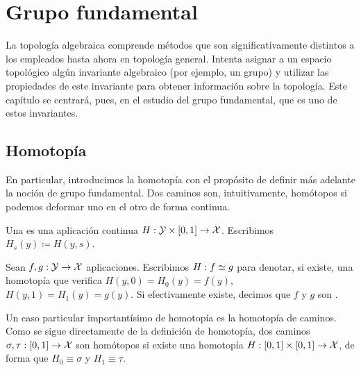 \chapter{Grupo fundamental}
\label{grf}

La topología algebraica comprende métodos que son significativamente distintos a los empleados hasta ahora en topología general. Intenta asignar a un espacio topológico algún invariante algebraico (por ejemplo, un grupo) y utilizar las propiedades de este invariante para obtener información sobre la topología. Este capítulo se centrará, pues, en el estudio del grupo fundamental, que es uno de estos invariantes.

\section{Homotopía}

En particular, introducimos la homotopía con el propósito de definir más adelante la noción de grupo fundamental. Dos caminos son, intuitivamente, homótopos si podemos deformar uno en el otro de forma continua.

\begin{defi}[Homotopía]
	Una  es una aplicación continua $H:\mathcal{Y}\times [0,1]\to \mathcal{X}$. Escribimos $H_s(y) \coloneqq H(y,s)$.
\end{defi}

\begin{defi}
	Sean $f,g:\mathcal{Y}\to\mathcal{X}$ aplicaciones. Escribimos $H:f\mathrel{\smash{\underset{}{\simeq}}} g$ para denotar, si existe, una homotopía que verifica $H(y,0)=H_0(y)=f(y)$, $H(y,1)=H_1(y)=g(y)$. Si efectivamente existe, decimos que $f$ y $g$ son .
\end{defi}

\begin{obs}
	Un caso particular importantísimo de homotopía es la homotopía de caminos. Como se sigue directamente de la definición de homotopía, dos caminos $\sigma,\tau:[0,1]\to\mathcal{X}$ son homótopos si existe una homotopía $H:[0,1]\times [0,1]\to\mathcal{X}$, de forma que $H_0\equiv\sigma$ y $H_1\equiv\tau$.
\end{obs} 

